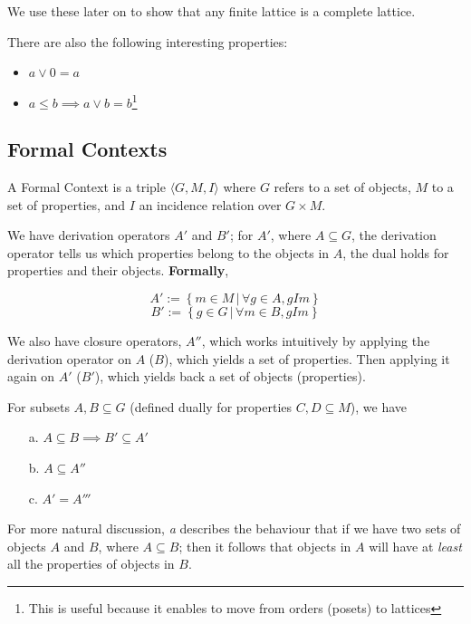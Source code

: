 We use these later on to show that any finite lattice is a complete lattice. 

There are also the following interesting properties: 
\begin{itemize}
    \item $a \lor 0 = a$ 
    \item $a \leq b \implies a \lor b = b$\footnote{This is useful because it enables to move from orders (posets) to lattices}
\end{itemize}

\subsection{Formal Contexts}
\label{subsec:Introduction-Formal_Contexts}
A Formal Context is a triple $\langle G, M, I \rangle$ where $G$ refers to a set of objects, $M$ to a set of properties, and $I$ an incidence relation over $G\times M$. 

We have derivation operators $A'$ and $B'$; for $A'$, where $A \subseteq G$, the derivation operator tells us which properties belong to the objects in $A$, the dual holds for properties and their objects. \textbf{Formally}, 

\begin{definition}
    \[ A' := \left\{m \in M \,|\, \forall g \in A, gIm\right\} \]
    \[ B' := \left\{g \in G \,|\, \forall m \in B, gIm\right\} \]
\end{definition}

We also have closure operators, $A''$, which works intuitively by applying the derivation operator on $A$ ($B$), which yields a set of properties. Then applying it again on $A'$ ($B'$), which yields back a set of objects (properties). 

\begin{proposition}
    For subsets $A, B\subseteq G$ (defined dually for properties $C,D \subseteq M$), we have
    \begin{itemize}
        \item[a.] $A \subseteq B \implies B' \subseteq A'$ 
        \item[b.] $A \subseteq A''$ 
        \item[c.] $A' = A'''$
    \end{itemize}
\end{proposition}

For more natural discussion, \textit{a} describes the behaviour that if we have two sets of objects $A$ and $B$, where $A \subseteq B$; then it follows that objects in $A$ will have at \textit{least} all the properties of objects in $B$. 

